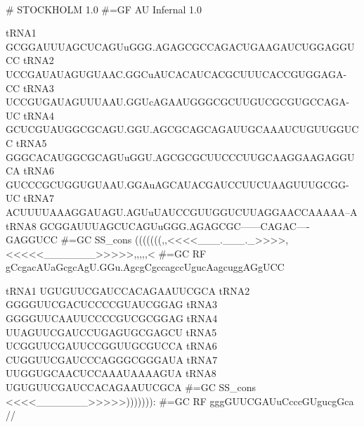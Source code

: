 {\samepage
{}\\

\begin{sreoutput}
# STOCKHOLM 1.0
#=GF AU Infernal 1.0

tRNA1        GCGGAUUUAGCUCAGUuGGG.AGAGCGCCAGACUGAAGAUCUGGAGGUCC
tRNA2        UCCGAUAUAGUGUAAC.GGCuAUCACAUCACGCUUUCACCGUGGAGA-CC
tRNA3        UCCGUGAUAGUUUAAU.GGUcAGAAUGGGCGCUUGUCGCGUGCCAGA-UC
tRNA4        GCUCGUAUGGCGCAGU.GGU.AGCGCAGCAGAUUGCAAAUCUGUUGGUCC
tRNA5        GGGCACAUGGCGCAGUuGGU.AGCGCGCUUCCCUUGCAAGGAAGAGGUCA
tRNA6        GUCCCGCUGGUGUAAU.GGAuAGCAUACGAUCCUUCUAAGUUUGCGG-UC
tRNA7        ACUUUUAAAGGAUAGU.AGUuUAUCCGUUGGUCUUAGGAACCAAAAA--A
tRNA8        GCGGAUUUAGCUCAGUuGGG.AGAGCGC------CAGAC----GAGGUCC
#=GC SS_cons (((((((,,<<<<___.___._>>>>,<<<<<_______>>>>>,,,,,<
#=GC RF      gCcgacAUaGcgcAgU.GGu.AgcgCgccagccUgucAagcuggAGgUCC

tRNA1        UGUGUUCGAUCCACAGAAUUCGCA
tRNA2        GGGGUUCGACUCCCCGUAUCGGAG
tRNA3        GGGGUUCAAUUCCCCGUCGCGGAG
tRNA4        UUAGUUCGAUCCUGAGUGCGAGCU
tRNA5        UCGGUUCGAUUCCGGUUGCGUCCA
tRNA6        CUGGUUCGAUCCCAGGGCGGGAUA
tRNA7        UUGGUGCAACUCCAAAUAAAAGUA
tRNA8        UGUGUUCGAUCCACAGAAUUCGCA
#=GC SS_cons <<<<_______>>>>>))))))):
#=GC RF      gggGUUCGAUuCcccGUgucgGca
//
\end{sreoutput}
}


